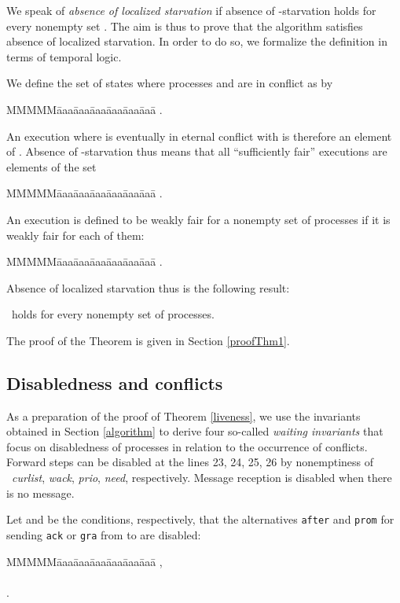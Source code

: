 \documentclass[10pt]{article} \usepackage[english]{babel}
\newenvironment{tab}{\begin{tabbing}
MMMMM\=aaa\=aaa\=aaa\=aaa\=aaa\=aaa\= \kill}{\end{tabbing}}
\def\S #1/{\mbox {\textsl{#1}}}
\def\T #1/{\mbox {\texttt{#1}}}
\begin{document}
We speak of \emph{absence of localized starvation} if absence of
-starvation holds for every nonempty set .  The aim is thus to
prove that the algorithm satisfies absence of localized starvation. In
order to do so, we formalize the definition in terms of temporal
logic.

We define the set of states where
processes  and  are in conflict as  by
\begin{tab}
\>  .
\end{tab}
An execution where  is eventually in eternal conflict with  is
therefore an element of .  Absence of
-starvation thus means that all ``sufficiently fair'' executions
are elements of the set
\begin{tab}
  \>  .
\end{tab}

An execution is defined to be weakly fair for a nonempty set of
processes  if it is weakly fair for each of them:
\begin{tab}
  \>  . 
\end{tab}
Absence of localized starvation thus is the following result:

\begin{theorem} \label{liveness} \  holds for every nonempty set
   of processes.
\end{theorem}

The proof of the Theorem is given in Section \ref{proofThm1}.

\subsection {Disabledness and conflicts} 
\label{conflicts}

As a preparation of the proof of Theorem \ref{liveness}, we use the
invariants obtained in Section \ref{algorithm} to derive four
so-called \emph{waiting invariants} that focus on disabledness of
processes in relation to the occurrence of conflicts.  Forward steps
can be disabled at the lines 23, 24, 25, 26 by nonemptiness of \S
curlist/, \S wack/, \S prio/, \S need/, respectively.  Message
reception is disabled when there is no message.

Let  and  be the conditions,
respectively, that the alternatives \T after/ and \T prom/ for sending
\T ack/ or \T gra/ from  to  are disabled:
\begin{tab}
\>  ,\\
\> \\
\>\>\>  .
\end{tab}
\end{document}
